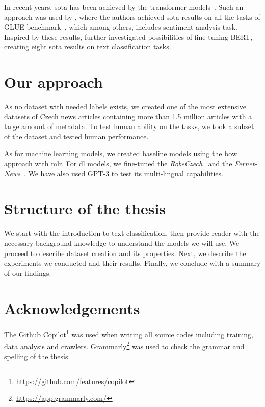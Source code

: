 In recent years, \ac{sota} has been achieved by the transformer models~\parencite[see][]{vaswaniAttentionAllYou2017d}.
Such an approach was used by \textcite{devlinBERTPretrainingDeep2019a}, where the authors achieved \ac{sota} results on
all the tasks of GLUE benchmark~\parencite{wangGLUEMultiTaskBenchmark2018}, which among others, includes 
sentiment analysis task. Inspired by these results, \textcite{sunHowFineTuneBERT2020} further investigated possibilities
of fine-tuning BERT, creating eight \ac{sota} results on text classification tasks.

\section*{Our approach}
As no dataset with needed labels exists, we created one of the most extensive datasets of Czech news articles
containing more than 1.5 million articles with a large amount of metadata.
To test human ability on the tasks, we took a subset of the dataset and tested human performance.

As for machine learning models, we created baseline models using the \acl{bow} approach with \acl{mlr}.
For \ac{dl} models, we fine-tuned the \textit{RobeCzech}~\parencite{strakaRobeCzechCzechRoBERTa2021}
and the \textit{Fernet-News}~\parencite{leheckaComparisonCzechTransformers2021}. 
We have also used GPT-3 \parencite{brownLanguageModelsAre2020b} to test its multi-lingual capabilities.

\section*{Structure of the thesis}
We start with the introduction to text classification, then provide reader with the necessary background knowledge
to understand the models we will use. We proceed to describe dataset creation and its properties.
Next, we describe the experiments we conducted and their results. Finally, we conclude with a summary of our findings.

\section*{Acknowledgements}
The Github Copilot\footnote{\url{https://github.com/features/copilot}}
was used when writing all source codes including training, data analysis and crawlers.
Grammarly\footnote{\url{https://app.grammarly.com/}} was used to check the grammar and spelling of the thesis.